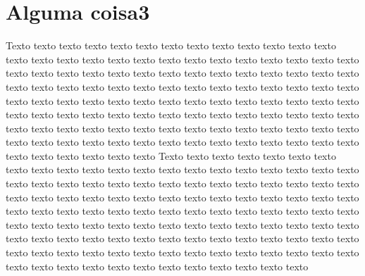 \section{Alguma coisa3}
\label{sec:exemplo_codigo_fonte}
Texto texto texto texto texto texto texto texto texto texto texto texto texto
texto texto texto texto texto texto texto texto texto texto texto texto texto
texto texto texto texto texto texto texto texto texto texto texto texto texto
texto texto texto texto texto texto texto texto texto texto texto texto texto
texto texto texto texto texto texto texto texto texto texto texto texto texto 
texto texto texto texto texto texto texto texto texto texto texto texto texto 
texto texto texto texto texto texto texto texto texto texto texto texto texto 
texto texto texto texto texto texto texto texto texto texto texto texto texto 
texto texto texto texto texto texto texto texto texto texto texto texto texto
Texto texto texto texto texto texto texto texto texto texto texto texto texto
texto texto texto texto texto texto texto texto texto texto texto texto texto
texto texto texto texto texto texto texto texto texto texto texto texto texto
texto texto texto texto texto texto texto texto texto texto texto texto texto
texto texto texto texto texto texto texto texto texto texto texto texto texto 
texto texto texto texto texto texto texto texto texto texto texto texto texto 
texto texto texto texto texto texto texto texto texto texto texto texto texto 
texto texto texto texto texto texto texto texto texto texto texto texto texto 
texto texto texto texto texto texto texto texto texto texto texto texto texto